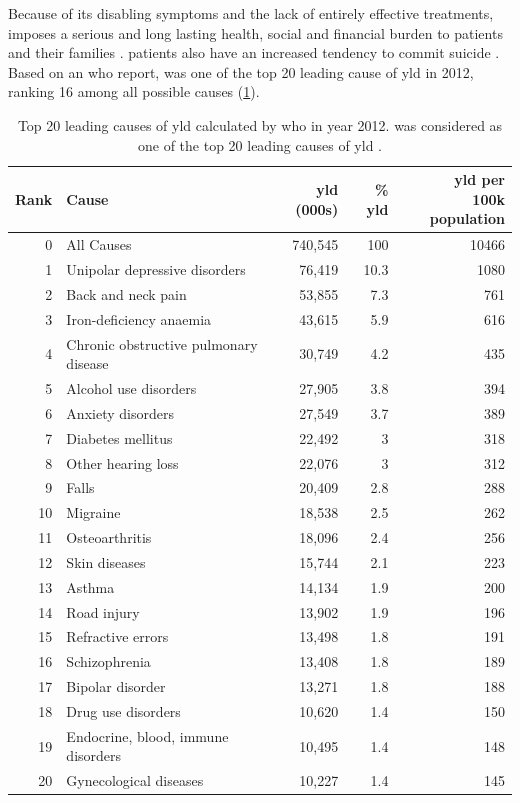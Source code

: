 	Because of its disabling symptoms and the lack of entirely effective treatments,  imposes a serious and long lasting health, social and financial burden to patients and their families \citep{Knapp2004}. 
	 patients also have an increased tendency to commit suicide \citep{Saha2007}.
	Based on an \gls{who} report,  was one of the top 20 leading cause of \gls{yld} in 2012, ranking 16 among all possible causes (\cref{tab:whoYLD}).
	\begin{table}[ht]
		\centering
		\caption[Top 20 leading causes of ]{Top 20 leading causes of \gls{yld} calculated by \gls{who} in year 2012.
			 was considered as one of the top 20 leading causes of \gls{yld} \citep{Geneva2013}.}
		\begin{tabular}{rp{5cm}rrr}
			\toprule
			Rank  & Cause & \gls{yld} (000s) & \% \gls{yld} & \specialcell[b]{\gls{yld} per \\100k population}\\
			\midrule
			0     & All Causes & 740,545 & 100   & 10466 \\
			1     & Unipolar depressive disorders & 76,419 & 10.3  & 1080 \\
			2     & Back and neck pain & 53,855 & 7.3   & 761 \\
			3     & Iron-deficiency anaemia & 43,615 & 5.9   & 616 \\
			4     & Chronic obstructive pulmonary disease & 30,749 & 4.2   & 435 \\
			5     & Alcohol use disorders & 27,905 & 3.8   & 394 \\
			6     & Anxiety disorders & 27,549 & 3.7   & 389 \\
			7     & Diabetes mellitus & 22,492 & 3     & 318 \\
			8     & Other hearing loss & 22,076 & 3     & 312 \\
			9     & Falls & 20,409 & 2.8   & 288 \\
			10    & Migraine & 18,538 & 2.5   & 262 \\
			11    & Osteoarthritis & 18,096 & 2.4   & 256 \\
			12    & Skin diseases & 15,744 & 2.1   & 223 \\
			13    & Asthma & 14,134 & 1.9   & 200 \\
			14    & Road injury & 13,902 & 1.9   & 196 \\
			15    & Refractive errors & 13,498 & 1.8   & 191 \\
			16    & Schizophrenia & 13,408 & 1.8   & 189 \\
			17    & Bipolar disorder & 13,271 & 1.8   & 188 \\
			18    & Drug use disorders & 10,620 & 1.4   & 150 \\
			19    & Endocrine, blood, immune disorders & 10,495 & 1.4   & 148 \\
			20    & Gynecological diseases & 10,227 & 1.4   & 145 \\
			\bottomrule
		\end{tabular}%
		\label{tab:whoYLD}%
	\end{table}%
